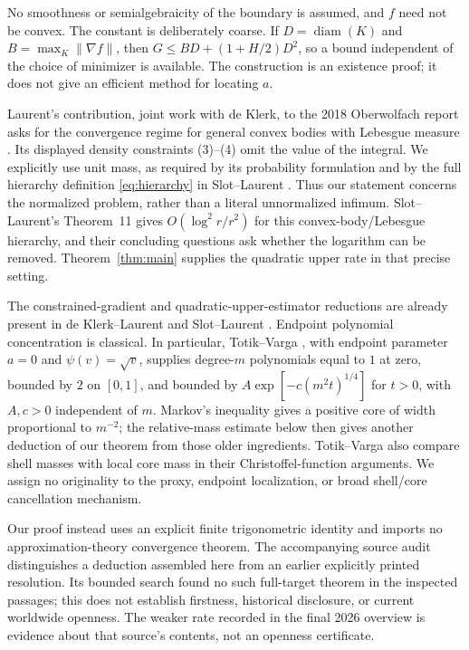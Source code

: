 \documentclass[11pt]{article}
\begin{document}
No smoothness or semialgebraicity of the boundary is assumed, and $f$
need not be convex. The constant is deliberately coarse. If
$D=\operatorname{diam}(K)$ and $B=\max_K\|\nabla f\|$, then
$G\le BD+(1+H/2)D^2$, so a bound independent of the choice of minimizer
is available. The construction is an existence proof; it does not give
an efficient method for locating $a$.

Laurent's contribution, joint work with de Klerk, to the 2018
Oberwolfach report asks for the convergence regime for general convex
bodies with Lebesgue measure \cite{Laurent2018}. Its displayed density
constraints (3)--(4) omit the value of the integral. We explicitly use
unit mass, as required by its probability formulation and by the full
hierarchy definition \eqref{eq:hierarchy} in
Slot--Laurent \cite[Eq.~(3)]{SlotLaurent2020}. Thus our statement concerns
the normalized problem, rather than a literal unnormalized infimum.
Slot--Laurent's Theorem~11 gives
$O(\log^2 r/r^2)$ for this convex-body/Lebesgue hierarchy, and their
concluding questions ask whether the logarithm can be removed.
Theorem~\ref{thm:main} supplies the quadratic upper rate in that
precise setting.

The constrained-gradient and quadratic-upper-estimator reductions are
already present in de Klerk--Laurent
\cite[preprint Cor.~4.3]{deKlerkLaurent2018}
and Slot--Laurent \cite[Lemmas~1 and~4]{SlotLaurent2020}.
Endpoint polynomial concentration is classical. In particular,
Totik--Varga \cite[Thm.~2.1]{TotikVarga2012}, with endpoint parameter
$a=0$ and $\psi(v)=\sqrt v$, supplies degree-$m$ polynomials equal to
$1$ at zero, bounded by $2$ on $[0,1]$, and bounded by
$A\exp[-c(m^2t)^{1/4}]$ for $t>0$, with $A,c>0$ independent of $m$.
Markov's inequality gives a positive core of width proportional to
$m^{-2}$; the relative-mass estimate below then gives another deduction
of our theorem from those older ingredients. Totik--Varga also compare
shell masses with local core mass in their Christoffel-function
arguments. We assign no originality to the proxy, endpoint
localization, or broad shell/core cancellation mechanism.

Our proof instead uses an explicit finite trigonometric identity and
imports no approximation-theory convergence theorem. The accompanying
source audit distinguishes a deduction assembled here from an earlier
explicitly printed resolution. Its bounded search found no such
full-target theorem in the inspected passages; this does not establish
firstness, historical disclosure, or current worldwide openness.
The weaker rate recorded in the final 2026 overview
\cite[Table~1]{LaurentSlot2026} is evidence about that source's contents,
not an openness certificate.
\end{document}
